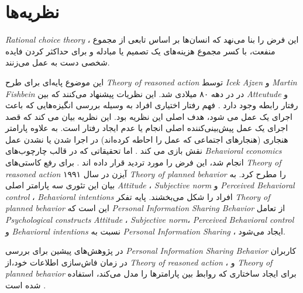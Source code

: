 \fi
\section{نظریه‌ها}
\textit{
  \gls{Rational choice theory}
}
،
این فرض را بنا می‌نهد که انسان‌ها بر اساس
تابعی از مجموع منفعت، با کسر مجموع هزینه‌های یک تصمیم
یا مبادله و برای حداکثر کردن فایده  شخصی دست به عمل می‌زنند.

این موضوع پایه‌ای برای طرح 
\textit{
  \gls{Theory of reasoned action}
}
توسط
\textit{
  \gls{Icek Ajzen}
}
و
\textit{
  \gls{Martin Fishbein}
}
در در دهه ۸۰ میلادی شد. این نظریات پیشنهاد می‌کنند که بین
\textit{
  \gls{Atteutude}
}
و رفتار رابطه وجود دارد
.
فهم رفتار اختیاری افراد به وسیله
بررسی انگیزه‌هایی که باعث اجرای یک عمل می شود، هدف اصلی این نظریه بود. این نظریه
بیان می کند که قصد اجرای یک عمل پیش‌بینی‌کننده اصلی انجام یا عدم ایجاد رفتار  است. به
علاوه پارامتر هنجاری
(هنجارهای اجتماعی که عمل را احاطه کرده‌اند)
در اجرا شدن یا نشدن عمل نقش بازی می کند
.
اما تحقیقاتی که در قالب چارچوب‌های
\textit{
  \gls{Behavioral economics}
}
انجام شد، این فرض را مورد تردید قرار داده اند
\!\citep{henrichEconomicManCrosscultural2005}.
برای رفع کاستی‌های
\textit{
  \gls{Theory of reasoned action}
}
آیزن در سال ۱۹۹۱
\!\citep{ajzenTheoryPlannedBehavior1991}
\textit{
  \gls{Theory of planned behavior}
}
را مطرح کرد. به بیان این تئوری سه پارامتر اصلی
\textit{
  \gls{Attitude}
}
\!،
\textit{\gls{Subjective norm}}
و
\textit{\gls{Perceived Behavioral control}}
\!،
\textit{\glspl{Behavioral intention}}
افراد را شکل می‌بخشند. پایه تفکر
\textit{
  \gls{Theory of planned behavior}
}
این است که
\textit{
  \gls{Personal Information Sharing Behavior}
}
از تعامل
\textit{\glspl{Psychological construct}}
\textit{
  \gls{Attitude}
}
\!،
\textit{\gls{Subjective norm}}،
\textit{\gls{Perceived Behavioral control}}
و
\textit{\glspl{Behavioral intention}}
نسبت به
\textit{
  \gls{Personal Information Sharing}
}،
ایجاد می‌شود.

در پژوهش‌های پیشین برای بررسی
\textit{
  \gls{Personal Information Sharing Behavior}
}
کاربران در زمان فاش‌سازی اطلاعات خود،از
\textit{
  \gls{Theory of reasoned action}
}
\!\citep{malhotraInternetUsersInformation2004}،
و
\textit{
  \gls{Theory of planned behavior}
}
برای ایجاد ساختاری که روابط بین پارامترها را مدل می‌کند، استفاده شده است
\!\citep{dinevExtendedPrivacyCalculus2006b}.

